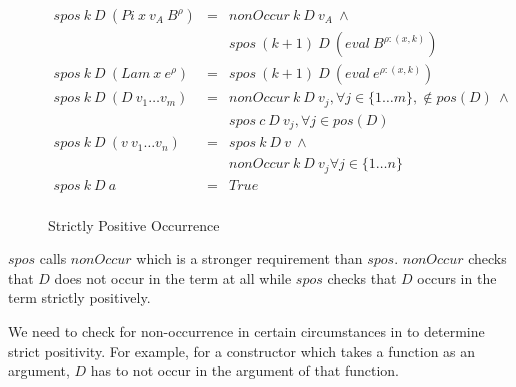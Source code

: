 \begin{figure}[H]
  \begin{equation*}
    \begin{aligned}
      spos \: k \: D \: (Pi \: x \: v_A \: B^{\rho}) & = & nonOccur \: k \: D \: v_A \: \land                                             \\
                                                     &   & spos \: (k+1) \: D \: (eval \: B^{\rho:(x,k)})                                 \\
      spos \: k \: D \: (Lam \: x \: e^{\rho})       & = & spos \: (k+1) \: D \: (eval \: e^{\rho:(x,k)})                                 \\
      spos \: k \: D \: (D \: v_1 \dots v_m)         & = & nonOccur \: k \: D \: v_j, \forall j \in \{1 \dots m\}, \notin pos(D) \: \land \\
                                                     &   & spos \: c \: D \: v_j, \forall j \in pos(D)                                    \\
      spos \: k \: D \: (v \: v_1 \dots v_n)         & = & spos \: k \: D \: v \: \land                                                   \\
                                                     &   & nonOccur \: k \: D \: v_j \forall j \in \{1 \dots n\}                          \\
      spos \: k \: D \: a                            & = & True                                                                           \\
    \end{aligned}
  \end{equation*}
  \caption{Strictly Positive Occurrence}
\end{figure}

$spos$ calls $nonOccur$ which is a stronger requirement than $spos$. $nonOccur$ checks that $D$ does not occur in the term at all while $spos$ checks that $D$ occurs in the term strictly positively.

We need to check for non-occurrence in certain circumstances in to determine strict positivity. For example, for a constructor which takes a function as an argument, $D$ has to not occur in the argument of that function.